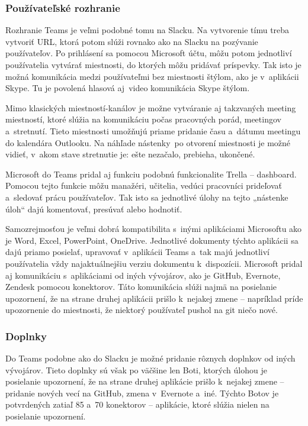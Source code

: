 \subsubsection{Používateľské rozhranie}
\indent Rozhranie Teams je veľmi podobné tomu na Slacku. Na vytvorenie tímu treba vytvoriť URL, ktorá potom slúži rovnako ako na Slacku na pozývanie používateľov. Po prihlásení sa pomocou Microsoft účtu, môžu potom jednotliví používatelia vytvárať miestnosti, do ktorých môžu pridávať príspevky. Tak isto je možná komunikácia medzi používateľmi bez miestnosti štýlom, ako je v aplikácii Skype. Tu je povolená hlasová aj video komunikácia Skype štýlom. 

\indent Mimo klasických miestností-kanálov je možne vytváranie aj takzvaných meeting miestností, ktoré slúžia na komunikáciu počas pracovných porád, meetingov a stretnutí. Tieto miestnosti umožňujú priame pridanie času a dátumu meetingu do kalendára Outlooku. Na náhľade nástenky po otvorení miestnosti je možné vidieť, v akom stave stretnutie je: ešte nezačalo, prebieha, ukončené. 

\indent Microsoft do Teams pridal aj funkciu podobnú funkcionalite Trella – dashboard. Pomocou tejto funkcie môžu manažéri, učitelia, vedúci pracovníci prideľovať a sledovať prácu používateľov. Tak isto sa jednotlivé úlohy na tejto „nástenke úloh“ dajú komentovať, presúvať alebo hodnotiť.

\indent Samozrejmosťou je veľmi dobrá kompatibilita s inými aplikáciami Microsoftu ako je Word, Excel, PowerPoint, OneDrive. Jednotlivé dokumenty týchto aplikácii sa dajú priamo posielať, upravovať v aplikácii Teams a tak majú jednotliví používatelia vždy najaktuálnejšiu verziu dokumentu k dispozícii. Microsoft pridal aj komunikáciu s aplikáciami od iných vývojárov, ako je GitHub, Evernote, Zendesk pomocou konektorov. Táto komunikácia slúži najmä na posielanie upozornení, že na strane druhej aplikácii prišlo k nejakej zmene – napríklad príde upozornenie do miestnosti, že niektorý používateľ pushol na git niečo nové.  
\subsubsection{Doplnky}
\indent Do Teams podobne ako do Slacku je možné pridanie rôznych doplnkov od iných vývojárov. Tieto doplnky sú však po väčšine len Boti, ktorých úlohou je posielanie upozornení, že na strane druhej aplikácie prišlo k nejakej zmene – pridanie nových vecí na GitHub, zmena v Evernote a iné. Týchto Botov je potvrdených zatiaľ 85 a 70 konektorov – aplikácie, ktoré slúžia nielen na posielanie upozornení. 
